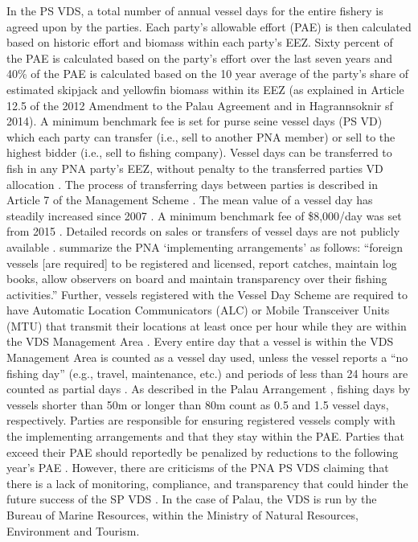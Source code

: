 \documentclass[11pt,english]{article}
\begin{document}
In the PS VDS, a total number of annual vessel days for the entire fishery is agreed upon by the parties. Each party’s allowable effort (PAE) is then calculated based on historic effort and biomass within each party’s EEZ. Sixty percent of the PAE is calculated based on the party’s effort over the last seven years and 40\% of the PAE is calculated based on the 10 year average of the party’s share of estimated skipjack and yellowfin biomass within its EEZ (as explained in Article 12.5 of the 2012 Amendment to the Palau Agreement and in Hagrannsoknir sf 2014). 
A minimum benchmark fee is set for purse seine vessel days (PS VD) which each party can transfer (i.e., sell to another PNA member) or sell to the highest bidder (i.e., sell to fishing company). Vessel days can be transferred to fish in any PNA party’s EEZ, without penalty to the transferred parties VD allocation \citep{PNA2016}. The process of transferring days between parties is described in Article 7 of the Management Scheme \citep{PNA2016}. The mean value of a vessel day has steadily increased since 2007 \citep{havice_2013}. A minimum benchmark fee of \$8,000/day was set from 2015 \citep{PNA2014a}. Detailed records on sales or transfers of vessel days are not publicly available \citep{havice_2013,yeeting2018stabilising}. 
\cite{yeeting2018stabilising} summarize the PNA ‘implementing arrangements’ as follows: “foreign vessels [are required] to be registered and licensed, report catches, maintain log books, allow observers on board and maintain transparency over their fishing activities.” Further, vessels registered with the Vessel Day Scheme are required to have Automatic Location Communicators (ALC) or Mobile Transceiver Units (MTU) that transmit their locations at least once per hour while they are within the VDS Management Area \citep{PNA2016}. Every entire day that a vessel is within the VDS Management Area is counted as a vessel day used, unless the vessel reports a “no fishing day” (e.g., travel, maintenance, etc.) and periods of less than 24 hours are counted as partial days \citep{PNA2016}.  As described in the Palau Arrangement \citep{PNA2016}, fishing days by vessels shorter than 50m or longer than 80m count as 0.5 and 1.5 vessel days, respectively. Parties are responsible for ensuring registered vessels comply with the implementing arrangements and that they stay within the PAE. Parties that exceed their PAE should reportedly be penalized by reductions to the following year’s PAE \citep{PNA2016}. However, there are criticisms of the PNA PS VDS claiming that there is a lack of monitoring, compliance, and transparency that could hinder the future success of the SP VDS \citep{Arnason2014,yeeting2018stabilising}. In the case of Palau, the VDS is run by the Bureau of Marine Resources, within the Ministry of Natural Resources, Environment and Tourism.
\end{document}
